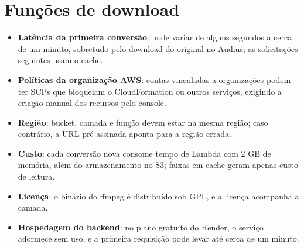 \documentclass[12pt,a4paper,oneside]{report}
\begin{document}
\section{Funções de download}
\begin{itemize}
\item \textbf{Latência da primeira conversão}: pode variar de alguns segundos a cerca de um minuto, sobretudo pelo download do original no Audius; as solicitações seguintes usam o cache.
\item \textbf{Políticas da organização AWS}: contas vinculadas a organizações podem ter SCPs que bloqueiam o CloudFormation ou outros serviços, exigindo a criação manual dos recursos pelo console.
\item \textbf{Região}: bucket, camada e função devem estar na mesma região; caso contrário, a URL pré-assinada aponta para a região errada.
\item \textbf{Custo}: cada conversão nova consome tempo de Lambda com 2 GB de memória, além do armazenamento no S3; faixas em cache geram apenas custo de leitura.
\item \textbf{Licença}: o binário do ffmpeg é distribuído sob GPL, e a licença acompanha a camada.
\item \textbf{Hospedagem do backend}: no plano gratuito do Render, o serviço adormece sem uso, e a primeira requisição pode levar até cerca de um minuto.
\end{itemize}
\end{document}
